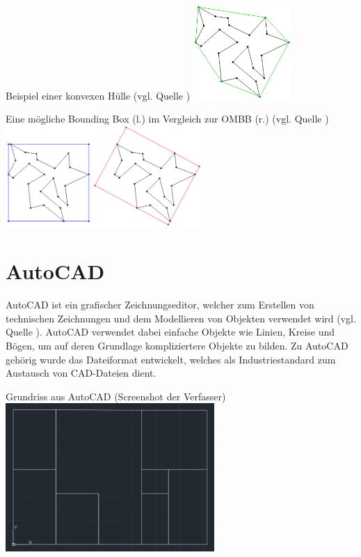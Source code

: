 \begin{Bild}{Beispiel einer konvexen Hülle (vgl. Quelle \cite{ombb})}
	\includegraphics[width = 140px]{Bilder/convex_hull}
\end{Bild}
\begin{Bild}{Eine mögliche Bounding Box (l.) im Vergleich zur OMBB (r.) (vgl. Quelle \cite{ombb})}
	\includegraphics[width = 282px]{Bilder/aabb_vs_ombb}
\end{Bild}

\section{AutoCAD}
AutoCAD ist ein grafischer Zeichnungseditor, welcher zum Erstellen von technischen Zeichnungen und dem Modellieren von Objekten verwendet wird (vgl. Quelle \cite{autocadwiki}).
AutoCAD verwendet dabei einfache Objekte wie Linien, Kreise und Bögen, um auf deren Grundlage kompliziertere Objekte zu bilden.
Zu AutoCAD gehörig wurde das Dateiformat  entwickelt, welches als Industriestandard zum Austausch von CAD-Dateien dient. \\

\begin{Bild}{Grundriss aus AutoCAD (Screenshot der Verfasser)}
	\includegraphics[width=300px]{Bilder/Grundriss}
\end{Bild}

